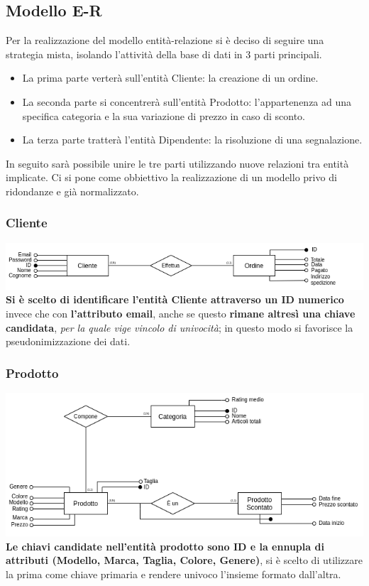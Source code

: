 \subsection{Modello E-R}
Per la realizzazione del modello entità-relazione si è deciso di seguire una strategia mista, isolando l'attività della base di dati in 3 parti principali. 
\begin{itemize}
    \item La prima parte verterà sull'entità Cliente: la creazione di un ordine.
    
    \item La seconda parte si concentrerà sull'entità Prodotto: l'appartenenza ad una specifica categoria e la sua variazione di prezzo in caso di sconto.
    
    \item La terza parte tratterà l'entità Dipendente: la risoluzione di una segnalazione.
\end{itemize}In seguito sarà possibile unire le tre parti utilizzando nuove relazioni tra entità implicate. Ci si pone come obbiettivo la realizzazione di un modello privo di ridondanze e già normalizzato. 

\subsubsection{Cliente}
\includegraphics[scale=0.65]{images/cliente.png}
\textbf{Si è scelto di identificare l'entità Cliente attraverso un ID numerico} invece che con\textbf{ l'attributo email}, anche se questo \textbf{rimane altresì una chiave candidata}, \textit{per la quale vige vincolo di univocità}; in questo modo si favorisce la pseudonimizzazione dei dati.

\subsubsection{Prodotto}
\includegraphics[scale=0.65]{images/prodotto.png}
\textbf{Le chiavi candidate nell'entità prodotto sono ID e la ennupla di attributi (Modello, Marca, Taglia, Colore, Genere)}, si è scelto di utilizzare la prima come chiave primaria e rendere univoco l'insieme formato dall'altra.
